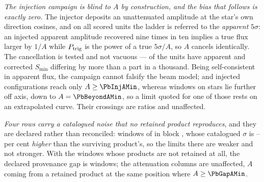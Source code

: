 \emph{The injection campaign is blind to $A$ by construction, and the bias
that follows is exactly zero.} The injector deposits an unattenuated amplitude
at the star's own direction cosines, and on all \PbInjNUnit{} scored units
the ladder is referred to the \emph{apparent} $5\sigma$: an injected apparent
amplitude recovered nine times in ten implies a true flux larger by $1/A$
while $P_{\rm trig}$ is the power of a true $5\sigma/A$, so $A$ cancels
identically. The cancellation is tested and not vacuous --- \PbInjNDistinct{}
of the \PbInjNUnit{} units have apparent and corrected $S_{\min}$ differing by
more than a part in a thousand. Being self-consistent in apparent flux, the
campaign cannot falsify the beam model; and injected configurations reach only
$A\ge\PbInjAMin$, whereas \PbNBeyond{} windows on \PbNBeyondStar{} stars lie
further off axis, down to $A=\PbBeyondAMin$, so a limit quoted for one of
those rests on an extrapolated curve. Their \PbNBeyondCross{} crossings are
ratios and unaffected.

\emph{Four rows carry a catalogued noise that no retained product
reproduces}, and they are declared rather than reconciled: \PbGapN{} windows
of \PbGapStar{} in block \texttt{\PbGapEb}, whose catalogued $\sigma$ is
\PbGapPctLo--\PbGapPctHi{} per cent \emph{higher} than the surviving
product's, so the limits there are weaker and not stronger. With the
\PbGapNoProd{} windows whose products are not retained at all, the declared
provenance gap is \PbGapDeclared{} windows; the attenuation columns are
unaffected, $A$ coming from a retained product at the same position where
$A\ge\PbGapAMin$.


